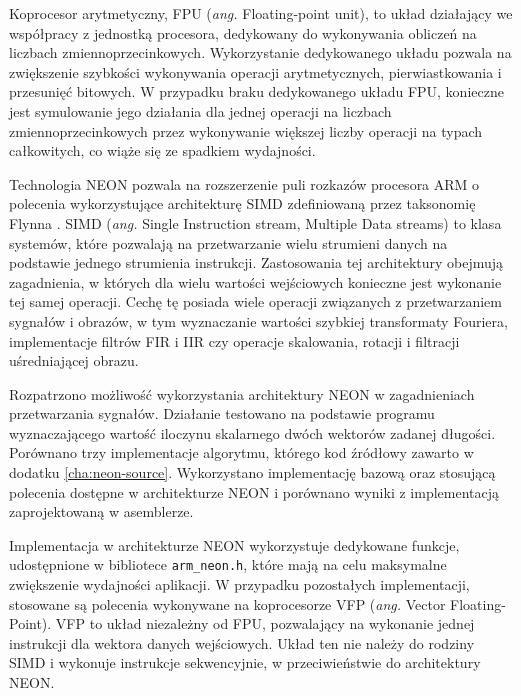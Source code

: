 Koprocesor arytmetyczny, FPU (\emph{ang.} Floating-point unit), to układ działający we współpracy z jednostką procesora, dedykowany do wykonywania obliczeń na liczbach zmiennoprzecinkowych. 
Wykorzystanie dedykowanego układu pozwala na zwiększenie szybkości wykonywania operacji arytmetycznych, pierwiastkowania i przesunięć bitowych. 
W przypadku braku dedykowanego układu FPU, konieczne jest symulowanie jego działania dla jednej operacji na liczbach zmiennoprzecinkowych przez wykonywanie większej liczby operacji na typach całkowitych, co wiąże się ze spadkiem wydajności. %

Technologia NEON pozwala na rozszerzenie puli rozkazów procesora ARM o polecenia wykorzystujące architekturę SIMD zdefiniowaną przez taksonomię Flynna \cite{Flynn1972}.
SIMD (\emph{ang.} Single Instruction stream, Multiple Data streams) to klasa systemów, które pozwalają na przetwarzanie wielu strumieni danych na podstawie jednego strumienia instrukcji. 
Zastosowania tej architektury obejmują zagadnienia, w których dla wielu wartości wejściowych konieczne jest wykonanie tej samej operacji. 
Cechę tę posiada wiele operacji związanych z przetwarzaniem sygnałów i obrazów, w tym  wyznaczanie wartości szybkiej transformaty Fouriera, implementacje filtrów FIR i IIR czy operacje skalowania, rotacji i filtracji uśredniającej obrazu.

Rozpatrzono możliwość wykorzystania architektury NEON w zagadnieniach przetwarzania sygnałów. 
Działanie testowano na podstawie programu wyznaczającego wartość iloczynu skalarnego dwóch wektorów zadanej długości. 
Porównano trzy implementacje algorytmu, którego kod źródłowy zawarto w dodatku \ref{cha:neon-source}.
Wykorzystano implementację bazową oraz stosującą polecenia dostępne w architekturze NEON i porównano wyniki z implementacją zaprojektowaną w asemblerze. %

Implementacja w architekturze NEON wykorzystuje dedykowane funkcje, udostępnione w bibliotece \texttt{arm\_neon.h}, które mają na celu maksymalne zwiększenie wydajności aplikacji. 
W przypadku pozostałych implementacji, stosowane są polecenia wykonywane na koprocesorze VFP (\emph{ang.} Vector Floating-Point). 
VFP to układ niezależny od FPU, pozwalający na wykonanie jednej instrukcji dla wektora danych wejściowych. 
Układ ten nie należy do rodziny SIMD i wykonuje instrukcje sekwencyjnie, w przeciwieństwie do architektury NEON.


